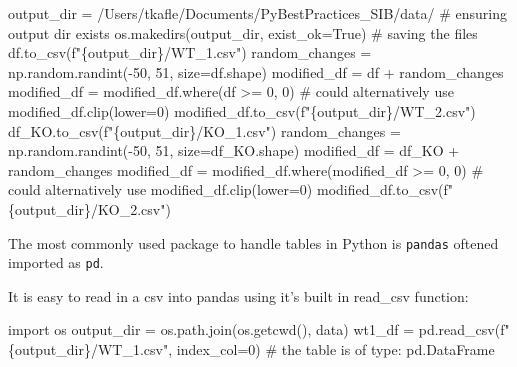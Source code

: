 \documentclass[
  letterpaper,
  DIV=11,
  numbers=noendperiod]{scrartcl}
\newenvironment{Shaded}{\begin{snugshade}}{\end{snugshade}}
\newcommand{\CommentTok}[1]{\textcolor[rgb]{0.37,0.37,0.37}{#1}}
\newcommand{\DecValTok}[1]{\textcolor[rgb]{0.68,0.00,0.00}{#1}}
\newcommand{\ImportTok}[1]{\textcolor[rgb]{0.00,0.46,0.62}{#1}}
\newcommand{\NormalTok}[1]{\textcolor[rgb]{0.00,0.23,0.31}{#1}}
\newcommand{\OperatorTok}[1]{\textcolor[rgb]{0.37,0.37,0.37}{#1}}
\newcommand{\SpecialCharTok}[1]{\textcolor[rgb]{0.37,0.37,0.37}{#1}}
\newcommand{\SpecialStringTok}[1]{\textcolor[rgb]{0.13,0.47,0.30}{#1}}
\newcommand{\StringTok}[1]{\textcolor[rgb]{0.13,0.47,0.30}{#1}}
\newcommand{\VariableTok}[1]{\textcolor[rgb]{0.07,0.07,0.07}{#1}}
\begin{document}
\begin{Shaded}
\begin{Highlighting}[]
\NormalTok{output\_dir }\OperatorTok{=} \StringTok{\textquotesingle{}/Users/tkafle/Documents/PyBestPractices\_SIB/data/\textquotesingle{}} \CommentTok{\# ensuring output dir exists}
\NormalTok{os.makedirs(output\_dir, exist\_ok}\OperatorTok{=}\VariableTok{True}\NormalTok{)}
\CommentTok{\# saving the files}
\NormalTok{df.to\_csv(}\SpecialStringTok{f"}\SpecialCharTok{\{}\NormalTok{output\_dir}\SpecialCharTok{\}}\SpecialStringTok{/WT\_1.csv"}\NormalTok{)}
\NormalTok{random\_changes }\OperatorTok{=}\NormalTok{ np.random.randint(}\OperatorTok{{-}}\DecValTok{50}\NormalTok{, }\DecValTok{51}\NormalTok{, size}\OperatorTok{=}\NormalTok{df.shape)}
\NormalTok{modified\_df }\OperatorTok{=}\NormalTok{ df }\OperatorTok{+}\NormalTok{ random\_changes}
\NormalTok{modified\_df }\OperatorTok{=}\NormalTok{ modified\_df.where(df }\OperatorTok{\textgreater{}=} \DecValTok{0}\NormalTok{, }\DecValTok{0}\NormalTok{) }\CommentTok{\# could alternatively use modified\_df.clip(lower=0)}
\NormalTok{modified\_df.to\_csv(}\SpecialStringTok{f"}\SpecialCharTok{\{}\NormalTok{output\_dir}\SpecialCharTok{\}}\SpecialStringTok{/WT\_2.csv"}\NormalTok{)}
\NormalTok{df\_KO.to\_csv(}\SpecialStringTok{f"}\SpecialCharTok{\{}\NormalTok{output\_dir}\SpecialCharTok{\}}\SpecialStringTok{/KO\_1.csv"}\NormalTok{)}
\NormalTok{random\_changes }\OperatorTok{=}\NormalTok{ np.random.randint(}\OperatorTok{{-}}\DecValTok{50}\NormalTok{, }\DecValTok{51}\NormalTok{, size}\OperatorTok{=}\NormalTok{df\_KO.shape)}
\NormalTok{modified\_df }\OperatorTok{=}\NormalTok{ df\_KO }\OperatorTok{+}\NormalTok{ random\_changes}
\NormalTok{modified\_df }\OperatorTok{=}\NormalTok{ modified\_df.where(modified\_df }\OperatorTok{\textgreater{}=} \DecValTok{0}\NormalTok{, }\DecValTok{0}\NormalTok{) }\CommentTok{\# could alternatively use modified\_df.clip(lower=0)}
\NormalTok{modified\_df.to\_csv(}\SpecialStringTok{f"}\SpecialCharTok{\{}\NormalTok{output\_dir}\SpecialCharTok{\}}\SpecialStringTok{/KO\_2.csv"}\NormalTok{)}
\end{Highlighting}
\end{Shaded}

The most commonly used package to handle tables in Python is
\texttt{pandas} oftened imported as \texttt{pd}.

It is easy to read in a csv into pandas using it's built in read\_csv
function:

\begin{Shaded}
\begin{Highlighting}[]
\ImportTok{import}\NormalTok{ os}
\NormalTok{output\_dir }\OperatorTok{=}\NormalTok{ os.path.join(os.getcwd(), }\StringTok{\textquotesingle{}data\textquotesingle{}}\NormalTok{)}
\NormalTok{wt1\_df }\OperatorTok{=}\NormalTok{ pd.read\_csv(}\SpecialStringTok{f"}\SpecialCharTok{\{}\NormalTok{output\_dir}\SpecialCharTok{\}}\SpecialStringTok{/WT\_1.csv"}\NormalTok{, index\_col}\OperatorTok{=}\DecValTok{0}\NormalTok{) }\CommentTok{\# the table is of type: pd.DataFrame}
\end{Highlighting}
\end{Shaded}
\end{document}
